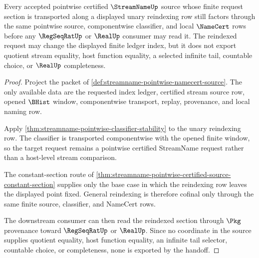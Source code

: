 \begin{theorem}
\label{thm:streamname-pointwise-source-reindex-cofinality}
Every accepted pointwise certified $\StreamNameUp$ source whose finite request section is transported along a displayed unary reindexing row still factors through the same pointwise source, componentwise classifier, and local $\NameCert$ rows before any $\RegSeqRatUp$ or $\RealUp$ consumer may read it. The reindexed request may change the displayed finite ledger index, but it does not export quotient stream equality, host function equality, a selected infinite tail, countable choice, or $\RealUp$ completeness.
\end{theorem}
\begin{proof}
Project the packet of \autoref{def:streamname-pointwise-namecert-source}. The only available data are the requested index ledger, certified stream source row, opened $\BHist$ window, componentwise transport, replay, provenance, and local naming row.

Apply \autoref{thm:streamname-pointwise-classifier-stability} to the unary reindexing row. The classifier is transported componentwise with the opened finite window, so the target request remains a pointwise certified StreamName request rather than a host-level stream comparison.

The constant-section route of \autoref{thm:streamname-pointwise-certified-source-constant-section} supplies only the base case in which the reindexing row leaves the displayed point fixed. General reindexing is therefore cofinal only through the same finite source, classifier, and NameCert rows.

The downstream consumer can then read the reindexed section through $\Pkg$ provenance toward $\RegSeqRatUp$ or $\RealUp$. Since no coordinate in the source supplies quotient equality, host function equality, an infinite tail selector, countable choice, or completeness, none is exported by the handoff.
\end{proof}

